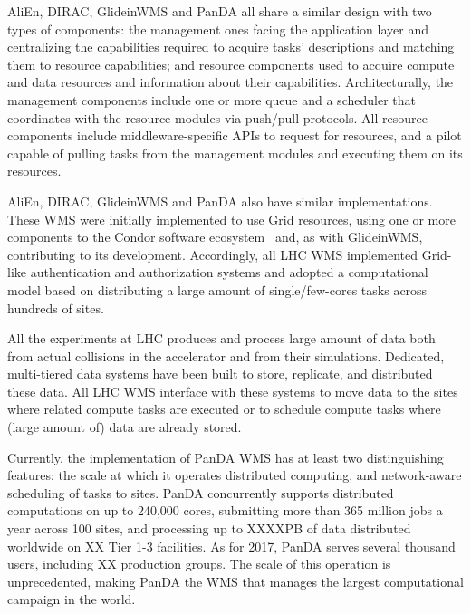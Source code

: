 AliEn, DIRAC, GlideinWMS and PanDA all share a similar design with two types of
components: the management ones facing the application layer and centralizing
the capabilities required to acquire tasks' descriptions and matching them to
resource capabilities; and resource components used to acquire compute and data
resources and information about their capabilities. Architecturally, the
management components include one or more queue and a scheduler that coordinates
with the resource modules via push/pull protocols. All resource components
include middleware-specific APIs to request for resources, and a pilot capable
of pulling tasks from the management modules and executing them on its
resources.

AliEn, DIRAC, GlideinWMS and PanDA also have similar implementations. These WMS
were initially implemented to use Grid resources, using one or more components
to the Condor software ecosystem~\cite{thain2005distributed} and, as with
GlideinWMS, contributing to its development. Accordingly, all LHC WMS
implemented Grid-like authentication and authorization systems and adopted a
computational model based on distributing a large amount of single/few-cores
tasks across hundreds of sites.

All the experiments at LHC produces and process large amount of data both from
actual collisions in the accelerator and from their simulations. Dedicated,
multi-tiered data systems have been built to store, replicate, and distributed
these data. All LHC WMS interface with these systems to move data to the sites
where related compute tasks are executed or to schedule compute tasks where
(large amount of) data are already stored.

Currently, the implementation of PanDA WMS has at least two distinguishing
features: the scale at which it operates distributed computing, and
network-aware scheduling of tasks to sites. PanDA concurrently supports distributed
computations on up to 240,000 cores, submitting more than 365 million jobs a
year across 100 sites, and processing up to XXXXPB of data distributed worldwide
on XX Tier 1-3 facilities. As for 2017, PanDA serves several thousand users,
including XX production groups. The scale of this operation is unprecedented,
making PanDA the WMS that manages the largest computational campaign in the
world.

